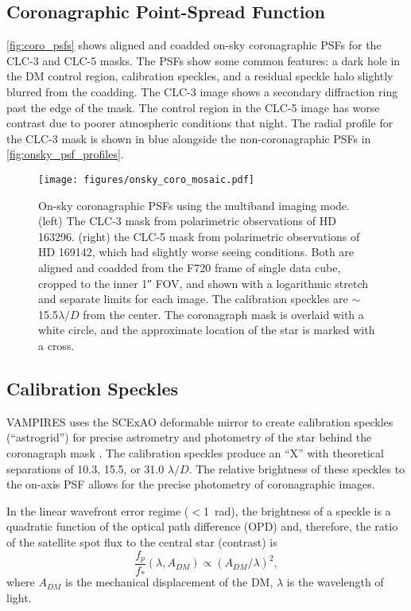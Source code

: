 \subsection{Coronagraphic Point-Spread Function}

\autoref{fig:coro_psfs} shows aligned and coadded on-sky coronagraphic PSFs for the CLC-3 and CLC-5 masks. The PSFs show some common features: a dark hole in the DM control region, calibration speckles, and a residual speckle halo slightly blurred from the coadding. The CLC-3 image shows a secondary diffraction ring past the edge of the mask. The control region in the CLC-5 image has worse contrast due to poorer atmospheric conditions that night. The radial profile for the CLC-3 mask is shown in blue alongside the non-coronagraphic PSFs in \autoref{fig:onsky_psf_profiles}.

\begin{figure}
    \centering
    \texttt{[image: figures/onsky\_coro\_mosaic.pdf]}
    \caption{On-sky coronagraphic PSFs using the multiband imaging mode. (left) The CLC-3 mask from polarimetric observations of HD 163296. (right) the CLC-5 mask from polarimetric observations of HD 169142, which had slightly worse seeing conditions. Both are aligned and coadded from the F720 frame of single data cube, cropped to the inner \ang{;;1} FOV, and shown with a logarithmic stretch and separate limits for each image. The calibration speckles are $\sim$15.5$\lambda/D$ from the center. The coronagraph mask is overlaid with a white circle, and the approximate location of the star is marked with a cross.\label{fig:coro_psfs}}
\end{figure}


\subsection{Calibration Speckles}\label{sec:astrogrid}

VAMPIRES uses the SCExAO deformable mirror to create calibration speckles (``astrogrid'') for precise astrometry and photometry of the star behind the coronagraph mask \citep{sahoo_precision_2020}. The calibration speckles produce an ``X'' with theoretical separations of 10.3, 15.5, or 31.0 $\lambda/D$. The relative brightness of these speckles to the on-axis PSF allows for the precise photometry of coronagraphic images.

In the linear wavefront error regime ($<$\SI{1}{\radian}), the brightness of a speckle is a quadratic function of the optical path difference (OPD) \citep{jovanovic_artificial_2015,currie_laboratory_2018,chen_post-processing_2023} and, therefore, the ratio of the satellite spot flux to the central star (contrast) is
\begin{equation}
    \label{eqn:astrogrid}
    \frac{f_p}{f_*}\left( \lambda, A_{DM}\right) \propto \left(A_{DM} / \lambda\right)^2,
\end{equation}
where $A_{DM}$ is the mechanical displacement of the DM, $\lambda$ is the wavelength of light. 

